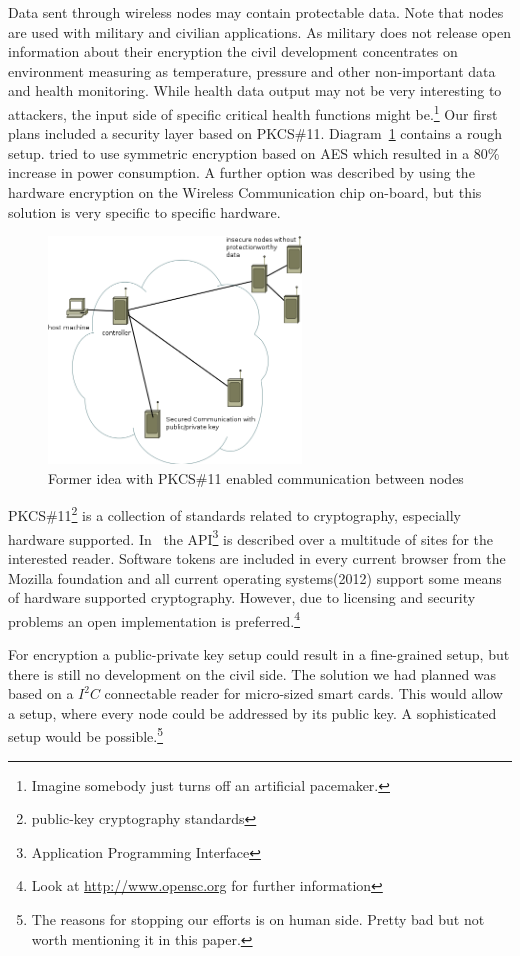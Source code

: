 Data sent through wireless nodes may contain protectable data. Note that nodes are used with military and civilian applications. As military does
not release open information about their encryption the civil development concentrates on environment measuring as temperature, pressure and other 
non-important data and health monitoring.\cite{Dispert}
While health data output may not be very interesting to attackers, the input side of specific critical health functions might be.\footnote{Imagine somebody 
just turns off an artificial pacemaker.}
Our first plans included a security layer based on \textsc{PKCS\#11}. Diagram~\ref{fig:pkcs11} contains a rough setup. \cite{wsnsec} tried to 
use symmetric encryption based on \textsc{AES} which resulted in a 80\% increase in power consumption. A further option was described by 
using the hardware encryption on the Wireless Communication chip on-board, but this solution is very specific to specific hardware.

\begin{figure}[h]
   \centering
   \includegraphics[width=0.6\textwidth]{pic/pkcs11.png}%
   \caption{Former idea with PKCS\#11 enabled communication between nodes}
   \label{fig:pkcs11}%
\end{figure}


\textsc{PKCS\#11}\footnote{public-key cryptography standards} is a collection of standards related to cryptography, especially hardware supported.
In~\cite{PKCS_RSA} the API\footnote{Application Programming Interface} is described over a multitude of sites for the interested reader.
Software tokens are included in every current browser from the Mozilla foundation and all current operating systems(2012) support some means of 
hardware supported cryptography. However, due to licensing and security problems an open implementation is preferred.\footnote{Look at \url{http://www.opensc.org} for further information}

For encryption a public-private key setup could result in a fine-grained setup, but there is still no development on the civil side.
The solution we had planned was based on a \(I^2C\) connectable reader for micro-sized smart cards. This would allow a setup, where every node
could be addressed by its public key. A sophisticated setup would be possible.\footnote{The reasons for stopping our efforts is on human side. Pretty
bad but not worth mentioning it in this paper.}
